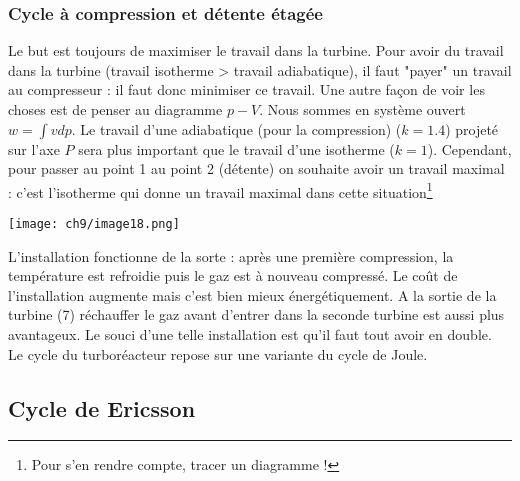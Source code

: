 	
		\subsubsection{Cycle à	compression	et détente	étagée}
		Le but est toujours de maximiser le travail dans la turbine. Pour avoir du travail 
		dans la turbine (travail isotherme > travail adiabatique), il faut "payer" un travail 
		au compresseur : il faut donc minimiser ce travail. Une autre façon de voir les choses 
		est de penser au diagramme $p-V$. Nous sommes en système ouvert $w = \int vdp$. Le travail 
		d'une adiabatique (pour la compression) ($k=1.4$)	 projeté sur l'axe $P$ sera plus 
		important que le travail d'une isotherme ($k=1$). Cependant, pour passer au point 1 au 
		point 2 (détente) on souhaite avoir un travail maximal : c'est l'isotherme qui donne 
		un travail maximal dans cette situation\footnote{Pour s'en rendre compte, tracer un 
		diagramme !}
		
				\begin{center}
		\texttt{[image: ch9/image18.png]}
		\end{center}			
		
		L'installation fonctionne de la sorte : après une première compression, la température 
		est refroidie puis le gaz est à nouveau compressé. Le coût de l'installation augmente 
		mais c'est bien mieux énergétiquement. A la sortie de la turbine (7) réchauffer le gaz
		avant d'entrer dans la seconde turbine est aussi plus avantageux. Le souci d'une telle 
		installation est qu'il faut tout avoir en double.\\
		Le cycle du turboréacteur repose sur une variante du cycle de Joule.
		
	\subsection{Cycle de Ericsson}
	
	
	
	
	
	
	
	
	
	
	
